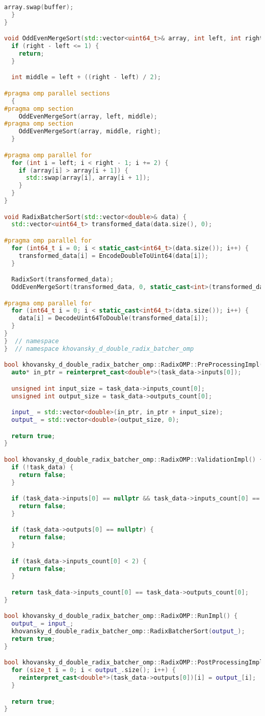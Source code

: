 \documentclass[12pt]{article}
\begin{document}
\begin{lstlisting}[language=C++,
    breaklines=true,       % Автоматический перенос строк
    columns=fullflexible ]
    array.swap(buffer);
  }
}

void OddEvenMergeSort(std::vector<uint64_t>& array, int left, int right) {
  if (right - left <= 1) {
    return;
  }

  int middle = left + ((right - left) / 2);

#pragma omp parallel sections
  {
#pragma omp section
    OddEvenMergeSort(array, left, middle);
#pragma omp section
    OddEvenMergeSort(array, middle, right);
  }

#pragma omp parallel for
  for (int i = left; i < right - 1; i += 2) {
    if (array[i] > array[i + 1]) {
      std::swap(array[i], array[i + 1]);
    }
  }
}

void RadixBatcherSort(std::vector<double>& data) {
  std::vector<uint64_t> transformed_data(data.size(), 0);

#pragma omp parallel for
  for (int64_t i = 0; i < static_cast<int64_t>(data.size()); i++) {
    transformed_data[i] = EncodeDoubleToUint64(data[i]);
  }

  RadixSort(transformed_data);
  OddEvenMergeSort(transformed_data, 0, static_cast<int>(transformed_data.size()));

#pragma omp parallel for
  for (int64_t i = 0; i < static_cast<int64_t>(data.size()); i++) {
    data[i] = DecodeUint64ToDouble(transformed_data[i]);
  }
}
}  // namespace
}  // namespace khovansky_d_double_radix_batcher_omp

bool khovansky_d_double_radix_batcher_omp::RadixOMP::PreProcessingImpl() {
  auto* in_ptr = reinterpret_cast<double*>(task_data->inputs[0]);

  unsigned int input_size = task_data->inputs_count[0];
  unsigned int output_size = task_data->outputs_count[0];

  input_ = std::vector<double>(in_ptr, in_ptr + input_size);
  output_ = std::vector<double>(output_size, 0);

  return true;
}

bool khovansky_d_double_radix_batcher_omp::RadixOMP::ValidationImpl() {
  if (!task_data) {
    return false;
  }

  if (task_data->inputs[0] == nullptr && task_data->inputs_count[0] == 0) {
    return false;
  }

  if (task_data->outputs[0] == nullptr) {
    return false;
  }

  if (task_data->inputs_count[0] < 2) {
    return false;
  }

  return task_data->inputs_count[0] == task_data->outputs_count[0];
}

bool khovansky_d_double_radix_batcher_omp::RadixOMP::RunImpl() {
  output_ = input_;
  khovansky_d_double_radix_batcher_omp::RadixBatcherSort(output_);
  return true;
}

bool khovansky_d_double_radix_batcher_omp::RadixOMP::PostProcessingImpl() {
  for (size_t i = 0; i < output_.size(); i++) {
    reinterpret_cast<double*>(task_data->outputs[0])[i] = output_[i];
  }

  return true;
}
\end{lstlisting}
\end{document}
